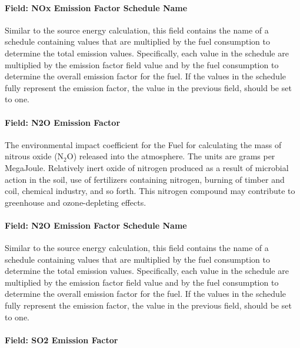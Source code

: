 \paragraph{Field: NOx Emission Factor Schedule Name}\label{field-nox-emission-factor-schedule-name}

Similar to the source energy calculation, this field contains the name of a schedule containing values that are multiplied by the fuel consumption to determine the total emission values. Specifically, each value in the schedule are multiplied by the emission factor field value and by the fuel consumption to determine the overall emission factor for the fuel. If the values in the schedule fully represent the emission factor, the value in the previous field, should be set to one.

\paragraph{Field: N2O Emission Factor}\label{field-n2o-emission-factor}

The environmental impact coefficient for the Fuel for calculating the mass of nitrous oxide (N\(_{2}\)O) released into the atmosphere. The units are grams per MegaJoule. Relatively inert oxide of nitrogen produced as a result of microbial action in the soil, use of fertilizers containing nitrogen, burning of timber and coil, chemical industry, and so forth. This nitrogen compound may contribute to greenhouse and ozone-depleting effects.

\paragraph{Field: N2O Emission Factor Schedule Name}\label{field-n2o-emission-factor-schedule-name}

Similar to the source energy calculation, this field contains the name of a schedule containing values that are multiplied by the fuel consumption to determine the total emission values. Specifically, each value in the schedule are multiplied by the emission factor field value and by the fuel consumption to determine the overall emission factor for the fuel. If the values in the schedule fully represent the emission factor, the value in the previous field, should be set to one.

\paragraph{Field: SO2 Emission Factor}\label{field-so2-emission-factor}

